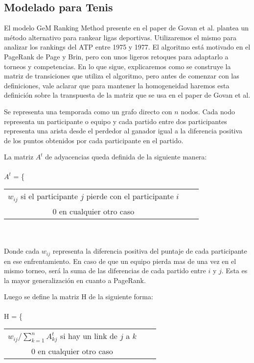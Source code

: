\subsection{Modelado para Tenis}

El modelo GeM Ranking Method presente en el paper de Govan et al. plantea un método alternativo para rankear ligas deportivas. Utilizaremos el mismo para analizar los rankings del ATP entre 1975 y 1977. El algoritmo está motivado en el PageRank de Page y Brin, pero con unos ligeros retoques para adaptarlo a torneos y competencias.
En lo que sigue, explicaremos como se construye la matriz de transiciones que utiliza el algoritmo, pero antes de comenzar con las definiciones, vale aclarar que para mantener la homogeneidad haremos esta definición sobre la transpuesta de la matriz que se usa en el paper de Govan et al.

Se representa una temporada como un grafo directo con $n$ nodos. Cada nodo representa un participante o equipo y cada partido entre dos participantes representa una arista desde el perdedor al ganador igual a la diferencia positiva de los puntos obtenidos por cada participante en el partido.

La matriz $A^t$ de adyacencias queda definida de la siguiente manera: 
\\\\
$A^t$ = \Bigg\{
  \begin{tabular}{ccc}
  $w_{ij}$ si el participante $j$ pierde con el participante $i$ \\
  0 en cualquier otro caso 
  \end{tabular}
\\\\
Donde cada $w_{ij}$ representa la diferencia positiva del puntaje de cada participante en ese enfrentamiento. En caso de que un equipo pierda mas de una vez en el mismo torneo, será la suma de las diferencias de cada partido entre $i$ y $j$. Esta es la mayor generalización en cuanto a PageRank.

Luego se define la matriz H de la siguiente forma:
\\\\
H = \Bigg\{
  \begin{tabular}{ccc}
  $w_{ij} / \sum\limits_{k=1}^n A^t_{kj} $ si hay un link de $j$ a $k$ \\
  0 en cualquier otro caso 
  \end{tabular}

